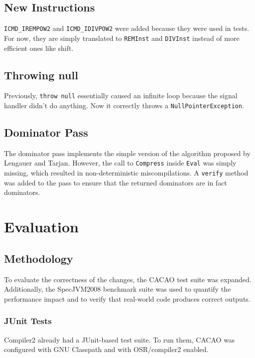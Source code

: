\documentclass[draft,final]{vutinfth} %
\begin{document}
    \section{New Instructions}

    \lstinline{ICMD_IREMPOW2} and \lstinline{ICMD_IDIVPOW2} were added because they were used in tests.
    For now, they are simply translated to \lstinline{REMInst} and \lstinline{DIVInst} instead of more efficient ones like shift.


    \section{Throwing null}

    Previously, \lstinline{throw null} essentially caused an infinite loop because the signal handler didn't do anything.
    Now it correctly throws a \lstinline{NullPointerException}.


    \section{Dominator Pass}

    The dominator pass implements the simple version of the algorithm\cite{dominators} proposed by
    Lengauer and Tarjan.
    However, the call to \lstinline{Compress} inside \lstinline{Eval} was simply missing,
    which resulted in non-deterministic miscompilations.
    A \lstinline{verify} method was added to the pass to ensure that the returned dominators are in fact dominators.


    \chapter{Evaluation}


    \section{Methodology}

    To evaluate the correctness of the changes, the CACAO test suite was expanded.
    Additionally, the SpecJVM2008 benchmark suite was used to quantify the performance impact and to verify that real-world code produces correct outputs.

    \subsection{JUnit Tests}

    Compiler2 already had a JUnit-based test suite.
    To run them, CACAO was configured with GNU Classpath and with OSR/compiler2 enabled.
\end{document}
